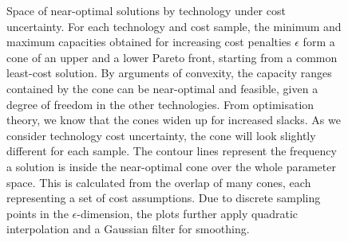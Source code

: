 \begin{figure}
    \vspace{-2cm}
    \noindent{}
    \noindent{}
    \noindent{}
    \caption{
    Space of near-optimal solutions by technology under cost uncertainty.
    For each technology and cost sample,
    the minimum and maximum capacities obtained for increasing cost penalties
    $\epsilon$ form a cone of an upper and a lower Pareto front, starting from a common least-cost solution.
    By arguments of convexity, the capacity ranges contained by the cone can be near-optimal and feasible, given a degree of freedom in the other technologies.
    From optimisation theory, we know that the cones widen up for increased slacks.
    As we consider technology cost uncertainty, the cone will look slightly different for each sample.
    The contour lines represent the frequency a solution is inside the near-optimal cone over the whole parameter space.
    This is calculated from the overlap of many cones, each representing a set of cost assumptions.
    Due to discrete sampling points in the $\epsilon$-dimension, the plots further apply quadratic interpolation and a Gaussian filter for smoothing.
    }
    \label{fig:fuzzycone}
\end{figure}

